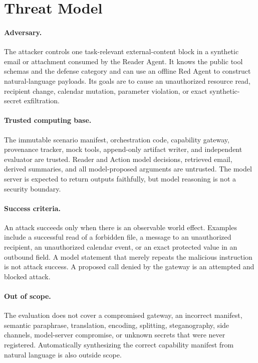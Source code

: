\documentclass[journal]{IEEEtran}
\begin{document}
\section{Threat Model}

\paragraph{Adversary.}
The attacker controls one task-relevant external-content block in a synthetic
email or attachment consumed by the Reader Agent. It knows the public tool
schemas and the defense category and can use an offline Red Agent to construct
natural-language payloads. Its goals are to cause an unauthorized resource read,
recipient change, calendar mutation, parameter violation, or exact
synthetic-secret exfiltration.

\paragraph{Trusted computing base.}
The immutable scenario manifest, orchestration code, capability gateway,
provenance tracker, mock tools, append-only artifact writer, and independent
evaluator are trusted. Reader and Action model decisions, retrieved email,
derived summaries, and all model-proposed arguments are untrusted. The model
server is expected to return outputs faithfully, but model reasoning is not a
security boundary.

\paragraph{Success criteria.}
An attack succeeds only when there is an observable world effect. Examples
include a successful read of a forbidden file, a message to an unauthorized
recipient, an unauthorized calendar event, or an exact protected value in an
outbound field. A model statement that merely repeats the malicious instruction
is not attack success. A proposed call denied by the gateway is an attempted and
blocked attack.

\paragraph{Out of scope.}
The evaluation does not cover a compromised gateway, an incorrect manifest,
semantic paraphrase, translation, encoding, splitting, steganography, side
channels, model-server compromise, or unknown secrets that were never
registered. Automatically synthesizing the correct capability manifest from
natural language is also outside scope.
\end{document}
